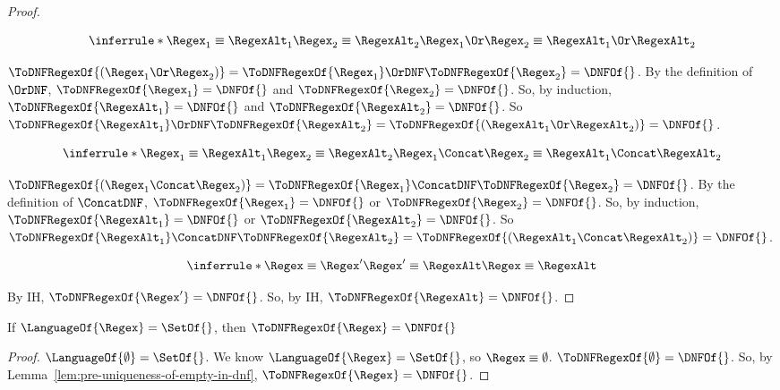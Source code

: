 \documentclass[sigplan,acmsmall]{acmart}
\begin{document}
\begin{proof}
  \begin{case}
    \[
      \inferrule*
      {
        \Regex_1 \equiv \RegexAlt_1\\
        \Regex_2 \equiv \RegexAlt_2
      }
      {
        \Regex_1 \Or \Regex_2 \equiv \RegexAlt_1 \Or \RegexAlt_2
      }
    \]

    $\ToDNFRegexOf{(\Regex_1 \Or \Regex_2)} =
    \ToDNFRegexOf{\Regex_1} \OrDNF \ToDNFRegexOf{\Regex_2} = \DNFOf{}$.
    By the definition of $\OrDNF$, $\ToDNFRegexOf{\Regex_1} = \DNFOf{}$ and
    $\ToDNFRegexOf{\Regex_2} = \DNFOf{}$.
    So, by induction, $\ToDNFRegexOf{\RegexAlt_1} = \DNFOf{}$ and
    $\ToDNFRegexOf{\RegexAlt_2} = \DNFOf{}$.
    So $\ToDNFRegexOf{\RegexAlt_1} \OrDNF \ToDNFRegexOf{\RegexAlt_2} =
    \ToDNFRegexOf{(\RegexAlt_1 \Or \RegexAlt_2)} = \DNFOf{}$.
  \end{case}

  \begin{case}
    \[
      \inferrule*
      {
        \Regex_1 \equiv \RegexAlt_1\\
        \Regex_2 \equiv \RegexAlt_2
      }
      {
        \Regex_1 \Concat \Regex_2 \equiv \RegexAlt_1 \Concat \RegexAlt_2
      }
    \]

    $\ToDNFRegexOf{(\Regex_1 \Concat \Regex_2)} =
    \ToDNFRegexOf{\Regex_1} \ConcatDNF \ToDNFRegexOf{\Regex_2} = \DNFOf{}$.
    By the definition of $\ConcatDNF$, $\ToDNFRegexOf{\Regex_1} = \DNFOf{}$ or
    $\ToDNFRegexOf{\Regex_2} = \DNFOf{}$.
    So, by induction, $\ToDNFRegexOf{\RegexAlt_1} = \DNFOf{}$ or
    $\ToDNFRegexOf{\RegexAlt_2} = \DNFOf{}$.
    So $\ToDNFRegexOf{\RegexAlt_1} \ConcatDNF \ToDNFRegexOf{\RegexAlt_2} =
    \ToDNFRegexOf{(\RegexAlt_1 \Concat \RegexAlt_2)} = \DNFOf{}$.
  \end{case}

  \begin{case}
    \[
      \inferrule*
      {
        \Regex \equiv \Regex'\\
        \Regex' \equiv \RegexAlt
      }
      {
        \Regex \equiv \RegexAlt
      }
    \]
  \end{case}

  By IH, $\ToDNFRegexOf{\Regex'} = \DNFOf{}$.
  So, by IH, $\ToDNFRegexOf{\RegexAlt} = \DNFOf{}$.
\end{proof}

\begin{lemma}
  \label{lem:uniqueness-of-empty-in-dnf}
  If $\LanguageOf{\Regex} = \SetOf{}$, then $\ToDNFRegexOf{\Regex} = \DNFOf{}$
\end{lemma}
\begin{proof}
  $\LanguageOf{\emptyset} = \SetOf{}$.
  We know $\LanguageOf{\Regex} = \SetOf{}$, so $\Regex \equiv \emptyset$.
  $\ToDNFRegexOf{\emptyset} = \DNFOf{}$.
  So, by Lemma~\ref{lem:pre-uniqueness-of-empty-in-dnf},
  $\ToDNFRegexOf{\Regex} = \DNFOf{}$.
\end{proof}
\end{document}
